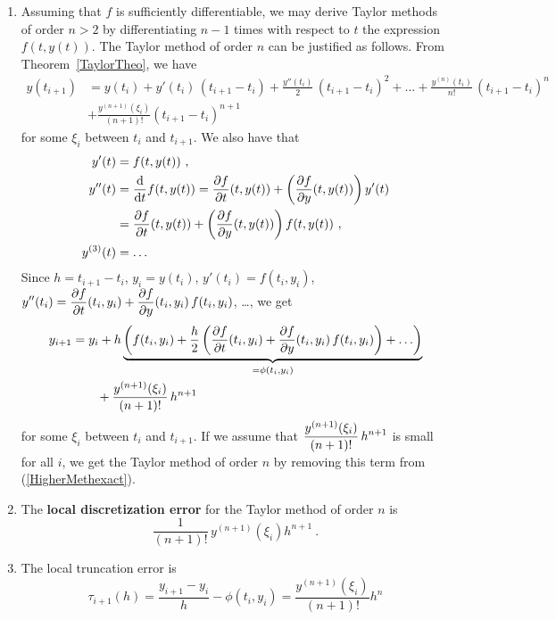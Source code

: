 \begin{rmkList} \label{Taylorordern}
\begin{enumerate}
\item Assuming that $f$ is sufficiently differentiable, we may derive
Taylor methods of order $n>2$ by differentiating $n-1$ times with respect to
$t$ the expression $f(t,y(t))$.  The Taylor method of order $n$ can be
justified as follows.  From Theorem~\ref{TaylorTheo}, we have
\begin{align*}
y(t_{i+1}) &= y(t_i) + y'(t_i)\,(t_{i+1} -t_i) +
\frac{y''(t_i)}{2}\,(t_{i+1}-t_i)^2 + \ldots +
\frac{y^{(n)}(t_i)}{n!}\,(t_{i+1}-t_i)^n \\
&+ \frac{y^{(n+1)}(\xi_i)}{(n+1)!}\left(t_{i+1} - t_i\right)^{n+1}
\end{align*}
for some $\xi_i$ between $t_i$ and $t_{i+1}$.  We also have that
\begin{align*}
y'(t) &= f(t,y(t)) \ , \\
y''(t) &= \dfdx{f(t,y(t))}{t}
= \pdydx{f}{t}(t,y(t)) + \left( \pdydx{f}{y}(t,y(t)) \right)y'(t) \\
 &= \pdydx{f}{t}(t,y(t)) + \left( \pdydx{f}{y}(t,y(t)) \right)f(t,y(t))
\ ,\\
y^{(3)}(t) &= \ldots
\end{align*}
Since $h=t_{i+1} -t_i$, $y_i = y(t_i)$, $y'(t_i) = f(t_i,y_i)$,
$\DS y''(t_i) =
\pdydx{f}{t}(t_i,y_i) + \pdydx{f}{y}(t_i,y_i)\, f(t_i,y_i)$, \ldots, we get
\begin{equation}\label{HigherMethexact}
\begin{split}
y_{i+1} &= y_i + h\underbrace{\left( f(t_i,y_i) + \frac{h}{2} \left(
\pdydx{f}{t}(t_i,y_i) + \pdydx{f}{y}(t_i,y_i) \, f(t_i,y_i)
\right) + \ldots \right)}_{=\phi(t_i,y_i)} \\
& \qquad + \frac{y^{(n+1)}(\xi_i)}{(n+1)!}\,h^{n+1}
\end{split}
\end{equation}
for some $\xi_i$ between $t_i$ and $t_{i+1}$.  If we assume that
$\DS \frac{y^{(n+1)}(\xi_i)}{(n+1)!}\,h^{n+1}$ is small
for all $i$, we get the Taylor method of order $n$ by removing this
term from (\ref{HigherMethexact}).
\item The
{\bfseries local discretization error} for the Taylor method 
of order $n$ is
\[
\frac{1}{(n+1)!}\, y^{(n+1)}(\xi_i)h^{n+1} \ .
\]
\item The local truncation error is
\[
\tau_{i+1}(h) = \frac{y_{i+1} - y_i}{h} - \phi(t_i,y_i) = 
\frac{y^{(n+1)}(\xi_i)}{(n+1)!}h^n
\]
\end{enumerate}
\end{rmkList}
